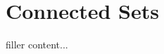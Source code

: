 \documentclass[../../templates/section]{subfiles}
\begin{document}
\section{Connected Sets}\label{sec:connected-sets}

filler content...
\end{document}
